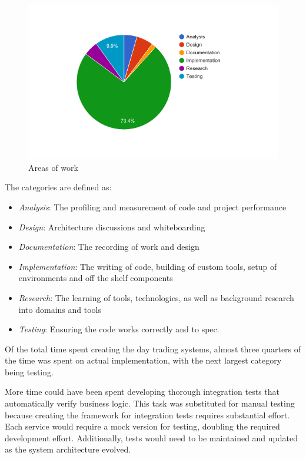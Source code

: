 \begin{figure}[tbph]
  \centering
  \includegraphics[width=0.8\linewidth]{graphics/work-pie}
  \caption{Areas of work}
  \label{fig:work-pie}
\end{figure}

\noindent The categories are defined as:

\begin{itemize}
  \item \textit{Analysis}: The profiling and measurement of code and project performance
  \item \textit{Design}: Architecture discussions and whiteboarding
  \item \textit{Documentation}: The recording of work and design
  \item \textit{Implementation}: The writing of code, building of custom tools, setup of environments and off the shelf components
  \item \textit{Research}: The learning of tools, technologies, as well as background research into domains and tools
  \item \textit{Testing}: Ensuring the code works correctly and to spec.
\end{itemize}

Of the total time spent creating the day trading systems, almost three quarters of the time was spent on actual implementation, with the next largest category being testing.

More time could have been spent developing thorough integration tests that automatically verify business logic.
This task was substituted for manual testing because creating the framework for integration tests requires substantial effort.
Each service would require a mock version for testing, doubling the required development effort.
Additionally, tests would need to be maintained and updated as the system architecture evolved.




